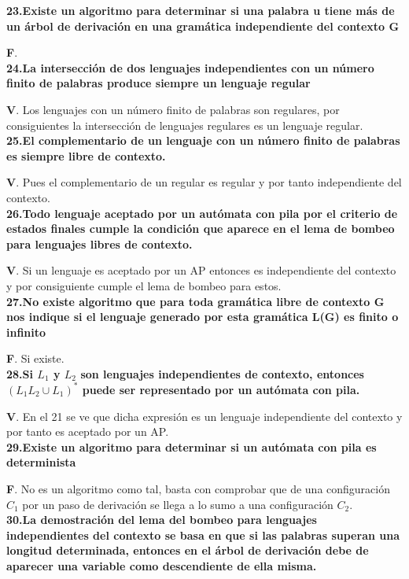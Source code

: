 \documentclass[a4paper,11pt]{article}
\begin{document}
\textbf{23.Existe un algoritmo para determinar si una palabra u tiene más de un árbol de derivación en una gramática independiente del contexto G}

\textbf{F}. \\

\textbf{24.La intersección de dos lenguajes independientes con un número finito de palabras produce siempre un lenguaje regular}

\textbf{V}. Los lenguajes con un número finito de palabras son regulares, por consiguientes la intersección de lenguajes regulares es un lenguaje regular. \\

\textbf{25.El complementario de un lenguaje con un número finito de palabras es siempre libre de contexto.}

\textbf{V}. Pues el complementario de un regular es regular y por tanto independiente del contexto. \\

\textbf{26.Todo lenguaje aceptado por un autómata con pila por el criterio de estados finales cumple la condición que aparece en el lema de bombeo para lenguajes libres de contexto.}

\textbf{V}. Si un lenguaje es aceptado por un AP entonces es independiente del contexto y por consiguiente cumple el lema de bombeo para estos. \\

\textbf{27.No existe algoritmo que para toda gramática libre de contexto G nos indique si el lenguaje generado por esta gramática L(G) es finito o infinito}

\textbf{F}. Si existe. \\

\textbf{28.Si $L_1$ y $L_2$ son lenguajes independientes de contexto, entonces $(L_1L_2\cup L_1)^*$ puede ser representado por un autómata con pila.}

\textbf{V}. En el 21 se ve que dicha expresión es un lenguaje independiente del contexto y por tanto es aceptado por un AP. \\

\textbf{29.Existe un algoritmo para determinar si un autómata con pila es determinista}

\textbf{F}. No es un algoritmo como tal, basta con comprobar que de una configuración $C_1$ por un paso de derivación se llega a lo sumo a una configuración $C_2$. \\

\textbf{30.La demostración del lema del bombeo para lenguajes independientes del contexto se basa en que si las palabras superan una longitud determinada, entonces en el árbol de derivación debe de aparecer una variable como descendiente de ella misma.} 
\end{document}
